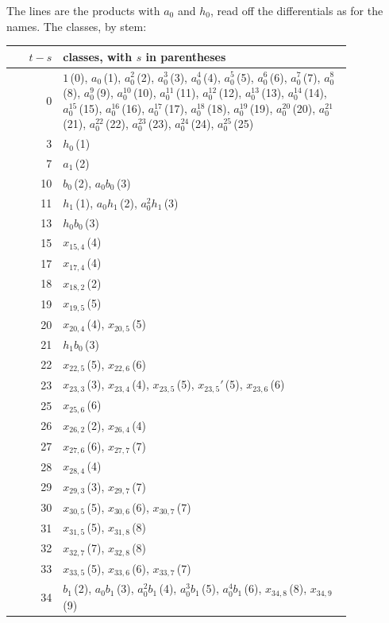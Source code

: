 \documentclass[11pt]{article}
\begin{document}
The lines are the products with $a_0$ and $h_0$, read off the differentials as for the names. The classes, by stem:
\begin{center}\footnotesize
\begin{longtable}{r>{\raggedright\arraybackslash}p{0.85\linewidth}}
$t-s$ & classes, with $s$ in parentheses \\
\midrule\endhead
0 & $1$\,(0), $a_0$\,(1), $a_0^2$\,(2), $a_0^3$\,(3), $a_0^4$\,(4), $a_0^5$\,(5), $a_0^6$\,(6), $a_0^7$\,(7), $a_0^8$\,(8), $a_0^9$\,(9), $a_0^{10}$\,(10), $a_0^{11}$\,(11), $a_0^{12}$\,(12), $a_0^{13}$\,(13), $a_0^{14}$\,(14), $a_0^{15}$\,(15), $a_0^{16}$\,(16), $a_0^{17}$\,(17), $a_0^{18}$\,(18), $a_0^{19}$\,(19), $a_0^{20}$\,(20), $a_0^{21}$\,(21), $a_0^{22}$\,(22), $a_0^{23}$\,(23), $a_0^{24}$\,(24), $a_0^{25}$\,(25) \\
3 & $h_0$\,(1) \\
7 & $a_1$\,(2) \\
10 & $b_0$\,(2), $a_0b_0$\,(3) \\
11 & $h_1$\,(1), $a_0h_1$\,(2), $a_0^2h_1$\,(3) \\
13 & $h_0b_0$\,(3) \\
15 & $x_{15,4}$\,(4) \\
17 & $x_{17,4}$\,(4) \\
18 & $x_{18,2}$\,(2) \\
19 & $x_{19,5}$\,(5) \\
20 & $x_{20,4}$\,(4), $x_{20,5}$\,(5) \\
21 & $h_1b_0$\,(3) \\
22 & $x_{22,5}$\,(5), $x_{22,6}$\,(6) \\
23 & $x_{23,3}$\,(3), $x_{23,4}$\,(4), $x_{23,5}$\,(5), $x_{23,5}'$\,(5), $x_{23,6}$\,(6) \\
25 & $x_{25,6}$\,(6) \\
26 & $x_{26,2}$\,(2), $x_{26,4}$\,(4) \\
27 & $x_{27,6}$\,(6), $x_{27,7}$\,(7) \\
28 & $x_{28,4}$\,(4) \\
29 & $x_{29,3}$\,(3), $x_{29,7}$\,(7) \\
30 & $x_{30,5}$\,(5), $x_{30,6}$\,(6), $x_{30,7}$\,(7) \\
31 & $x_{31,5}$\,(5), $x_{31,8}$\,(8) \\
32 & $x_{32,7}$\,(7), $x_{32,8}$\,(8) \\
33 & $x_{33,5}$\,(5), $x_{33,6}$\,(6), $x_{33,7}$\,(7) \\
34 & $b_1$\,(2), $a_0b_1$\,(3), $a_0^2b_1$\,(4), $a_0^3b_1$\,(5), $a_0^4b_1$\,(6), $x_{34,8}$\,(8), $x_{34,9}$\,(9) \\

\end{longtable}
\end{center}
\end{document}

